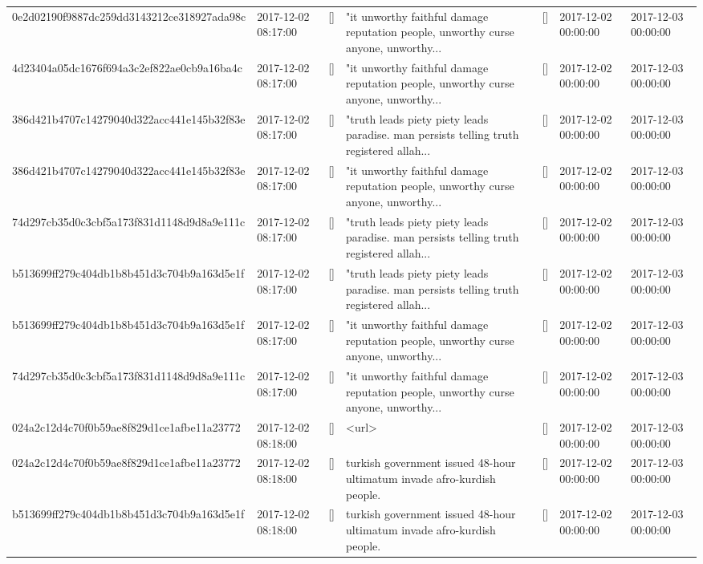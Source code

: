 \begin{tabular}{lllllll}
0e2d02190f9887dc259dd3143212ce318927ada98c & 2017-12-02 08:17:00 & [] & "it unworthy faithful damage reputation people, unworthy curse anyone, unworthy... & [] & 2017-12-02 00:00:00 & 2017-12-03 00:00:00 \\
4d23404a05dc1676f694a3c2ef822ae0cb9a16ba4c & 2017-12-02 08:17:00 & [] & "it unworthy faithful damage reputation people, unworthy curse anyone, unworthy... & [] & 2017-12-02 00:00:00 & 2017-12-03 00:00:00 \\
386d421b4707c14279040d322acc441e145b32f83e & 2017-12-02 08:17:00 & [] & "truth leads piety piety leads paradise. man persists telling truth registered allah... & [] & 2017-12-02 00:00:00 & 2017-12-03 00:00:00 \\
386d421b4707c14279040d322acc441e145b32f83e & 2017-12-02 08:17:00 & [] & "it unworthy faithful damage reputation people, unworthy curse anyone, unworthy... & [] & 2017-12-02 00:00:00 & 2017-12-03 00:00:00 \\
74d297cb35d0c3cbf5a173f831d1148d9d8a9e111c & 2017-12-02 08:17:00 & [] & "truth leads piety piety leads paradise. man persists telling truth registered allah... & [] & 2017-12-02 00:00:00 & 2017-12-03 00:00:00 \\
b513699ff279c404db1b8b451d3c704b9a163d5e1f & 2017-12-02 08:17:00 & [] & "truth leads piety piety leads paradise. man persists telling truth registered allah... & [] & 2017-12-02 00:00:00 & 2017-12-03 00:00:00 \\
b513699ff279c404db1b8b451d3c704b9a163d5e1f & 2017-12-02 08:17:00 & [] & "it unworthy faithful damage reputation people, unworthy curse anyone, unworthy... & [] & 2017-12-02 00:00:00 & 2017-12-03 00:00:00 \\
74d297cb35d0c3cbf5a173f831d1148d9d8a9e111c & 2017-12-02 08:17:00 & [] & "it unworthy faithful damage reputation people, unworthy curse anyone, unworthy... & [] & 2017-12-02 00:00:00 & 2017-12-03 00:00:00 \\
024a2c12d4c70f0b59ae8f829d1ce1afbe11a23772 & 2017-12-02 08:18:00 & [] & <url> & [] & 2017-12-02 00:00:00 & 2017-12-03 00:00:00 \\
024a2c12d4c70f0b59ae8f829d1ce1afbe11a23772 & 2017-12-02 08:18:00 & [] & turkish government issued 48-hour ultimatum invade afro-kurdish people. & [] & 2017-12-02 00:00:00 & 2017-12-03 00:00:00 \\
b513699ff279c404db1b8b451d3c704b9a163d5e1f & 2017-12-02 08:18:00 & [] & turkish government issued 48-hour ultimatum invade afro-kurdish people. & [] & 2017-12-02 00:00:00 & 2017-12-03 00:00:00 \\

\end{tabular}
